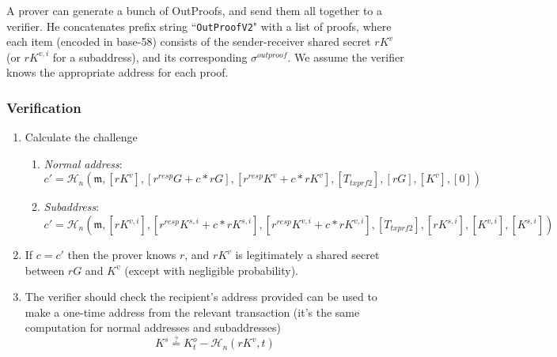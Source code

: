 A prover can generate a bunch of OutProofs, and send them all together to a verifier. He concatenates prefix string ``{\tt OutProofV2}" with a list of proofs, where each item (encoded in base-58) consists of the sender-receiver shared secret $r K^v$ (or $r K^{v,i}$ for a subaddress), and its corresponding $\sigma^{outproof}$. We assume the verifier knows the appropriate address for each proof.

\subsubsection*{Verification}

\begin{enumerate}
    \item Calculate the challenge
    \begin{enumerate}
        \item {\em Normal address}:\vspace{.145cm}
	    \[c' = \mathcal{H}_n(\mathfrak{m},[rK^v], [r^{resp} G + c*r G], [r^{resp} K^v + c*r K^v], [T_{txprf2}], [rG], [K^v], [0])\]
	    \item {\em Subaddress}:\vspace{.16cm}
	    \[c' = \mathcal{H}_n(\mathfrak{m},[rK^{v,i}], [r^{resp} K^{s,i} + c*r K^{s,i}], [r^{resp} K^{v,i} + c*r K^{v,i}], [T_{txprf2}], [rK^{s,i}], [K^{v,i}], [K^{s,i}])\]
    \end{enumerate}{}
    \item If $c = c'$ then the prover knows $r$, and $rK^v$ is legitimately a shared secret between $r G$ and $K^v$ (except with negligible probability).
    \item The verifier should check the recipient's address provided can be used to make a one-time address from the relevant transaction (it's the same computation for normal addresses and subaddresses)
    \[K^s \stackrel{?}{=} K^o_t - \mathcal{H}_n(r K^v,t)\]

\end{enumerate}
